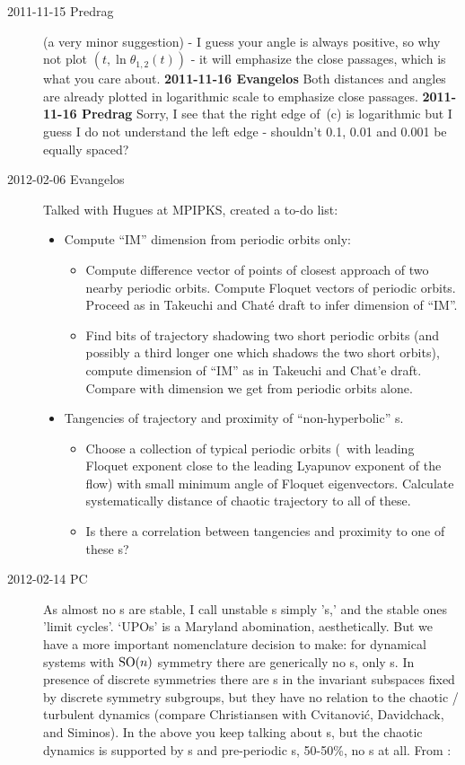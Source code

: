 \begin{description}
\item[2011-11-15 Predrag] (a very minor suggestion) - I guess your angle
is always positive, so why not plot $(t,\ln \theta_{1,2}(t))$ - it will
emphasize the close passages, which is what you care about.
{\bf 2011-11-16 Evangelos} Both distances and angles are already plotted
in logarithmic scale to emphasize close passages.
{\bf 2011-11-16 Predrag}
Sorry, I see that the right edge of \,(c) is logarithmic
but I guess I do not understand the left edge - shouldn't 0.1, 0.01 and 0.001
be equally spaced?

\item[2012-02-06 Evangelos] Talked with Hugues at MPIPKS, created a to-do list:
\begin{itemize}
  \item Compute ``IM'' dimension from periodic orbits only:
	\begin{itemize}
        \item
        Compute difference vector of points of closest approach of two
        nearby periodic orbits. Compute Floquet vectors of periodic
        orbits. Proceed as in Takeuchi and Chat\'e draft to infer
        dimension of ``IM''.
        \item
        Find bits of trajectory shadowing two short periodic orbits (and
        possibly a third longer one which shadows the two short orbits),
        compute dimension of ``IM'' as in Takeuchi and Chat'e draft.
        Compare with dimension we get from periodic orbits alone.
    \end{itemize}
  \item Tangencies of trajectory and proximity of ``non-hyperbolic'' \po s.
	\begin{itemize}
        \item
        Choose a collection of typical periodic orbits (\ie\ with leading
        Floquet exponent close to the leading Lyapunov exponent of the flow)
        with small minimum angle of Floquet eigenvectors. Calculate
        systematically distance of chaotic trajectory to all of these.
        \item
        Is there a correlation between tangencies and proximity to one of
        these \po s?
	\end{itemize}
\end{itemize}

\item[2012-02-14 PC]                        \toCB
As almost no \po s are stable, I call unstable \po s simply '\po s,' and
the stable ones 'limit cycles'. `UPOs' is a Maryland abomination,
aesthetically. But we have a more important nomenclature decision to
make: for dynamical systems with $\textrm{SO}(n)$ symmetry there are generically
no \po s, only \rpo s. In presence of discrete symmetries there are \po s
in the invariant subspaces fixed by discrete symmetry subgroups, but they
have no relation to the chaotic / turbulent dynamics (compare
Christiansen with Cvitanovi{\'c}, Davidchack, and
Siminos). In the above you keep talking about \po s, but the
chaotic dynamics is supported by \rpo s and pre-periodic \rpo s, 50-50\%,
no \po s at all. From :


\end{description}

